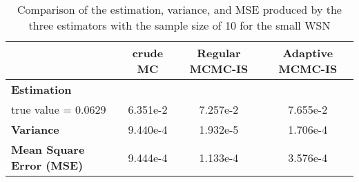 \begin{table}[H]
    \centering
    \caption{Comparison of the estimation, variance, and MSE produced by the three estimators with the sample size of 10 for the small WSN}
    \label{table:small_WSN_results}
    \small
    \begin{tabular}{lccc}
        \hline
        & \textbf{crude MC} & \textbf{Regular MCMC-IS} & \textbf{Adaptive MCMC-IS} \\
        \hline
        \textbf{Estimation}\\
        true value = 0.0629 & 6.351e-2 & 7.257e-2 & 7.655e-2\\
        \textbf{Variance} & 9.440e-4 & 1.932e-5 & 1.706e-4\\
        \textbf{Mean Square Error (MSE)} & 9.444e-4 & 1.133e-4 & 3.576e-4\\
        \hline
    \end{tabular}
\end{table}